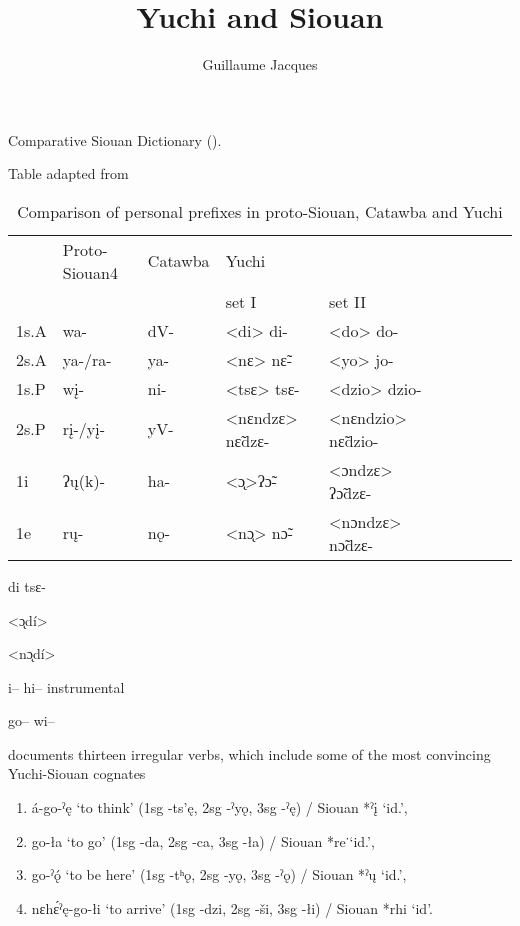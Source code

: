 \documentclass[oneside,a4paper,11pt]{article}
\newcommand{\ipa}[1]{{\phon#1}} %
\begin{document}
 
\title{Yuchi and Siouan}
\author{Guillaume Jacques}
\maketitle

Comparative Siouan Dictionary (\citealt{rankin15csd}). 

Table adapted from \citet{ranking98yuchi}
  
  \citet[325]{wagner38yuchi}
  \begin{table}[H]
  \caption{Comparison of personal prefixes in proto-Siouan, Catawba and Yuchi}
\begin{tabular}{llllllllll}
\toprule
&Proto-Siouan4  & 	Catawba  & 	Yuchi  & 	  & 	  \\ 
  & 	  && 	set I  & 	set II   \\ 
  \midrule
1s.A & 	\ipa{wa-}  & 	\ipa{dV-}  & 	<di> \ipa{di-}  & 	<do> \ipa{do-}  \\ 
2s.A  & 	\ipa{*ya-/ra-}  & 	\ipa{ya-}  & 	<nɛ> \ipa{nɛ̃-}  & <yo>	\ipa{jo-}  \\ 
\midrule
1s.P  & 	\ipa{wį-}  & 	\ipa{ni-}  & 	<tsɛ> \ipa{tsɛ-}  & 	<dzio> \ipa{dzio-}  \\ 
2s.P  & 	\ipa{*rį-/yį-}  & 	\ipa{yV-}  & <nɛndzɛ>	\ipa{nɛ̃dzɛ-}  & <nɛndzio>	\ipa{nɛ̃dzio-}  \\ 
\midrule
1i  & 	\ipa{ʔų(k)-}  & 	\ipa{ha-}  & 	<ɔ̨>\ipa{ʔɔ̃-}  & <ɔndzɛ>	\ipa{ʔɔ̃dzɛ-}  \\ 
1e  & 	\ipa{rų-}  & 	\ipa{nǫ-}  & <nɔ̨>	\ipa{nɔ̃-}  & 	 <nɔndzɛ> \ipa{nɔ̃dzɛ-}  \\ 
\bottomrule
\end{tabular}
\end{table}
\ipa{di}
\ipa{tsɛ-}

<ɔ̨dí>

<nɔ̨dí>


i-- hi-- instrumental


go--
wi--

 \citet{wagner38yuchi}
\citet{wagner31tales}
\citet{ullrich08}
\citet{linn01euchee}
\citet{taylor76motion}
\citet{rankin95ablaut}
\citet{ranking98yuchi}
\citet{csd2006}
\citet{ballard75yuchi}
\citet{koontz83syncopating}
\citet{chafe76macro}
\citet{elmendorf64}

\citet[334-5]{wagner38yuchi}
 documents thirteen irregular verbs, which include some of the most convincing Yuchi-Siouan cognates
\begin{enumerate}
\item   \ipa{á-go-ˀę} ‘to think’ (1sg \ipa{-ts’ę}, 2sg \ipa{-ˀyǫ}, 3sg \ipa{-ˀę}) / Siouan *\ipa{ˀį} ‘id.’, 
\item \ipa{go-ła} ‘to go’ (1sg \ipa{-da}, 2sg \ipa{-ca}, 3sg \ipa{-ła}) / Siouan *\ipa{re}˙‘id.’, 
\item \ipa{go-ˀǫ́} ‘to be here’ (1sg \ipa{-tʰǫ}, 2sg \ipa{-yǫ}, 3sg \ipa{-ˀǫ}) / Siouan *\ipa{ˀų} ‘id.’, 
\item \ipa{nɛhɛ́ˀę-go-łi} ‘to arrive’ (1sg \ipa{-dzi}, 2sg \ipa{-ši}, 3sg \ipa{-łi}) / Siouan *\ipa{rhi} ‘id’. 
\end{enumerate}  
\end{document}
